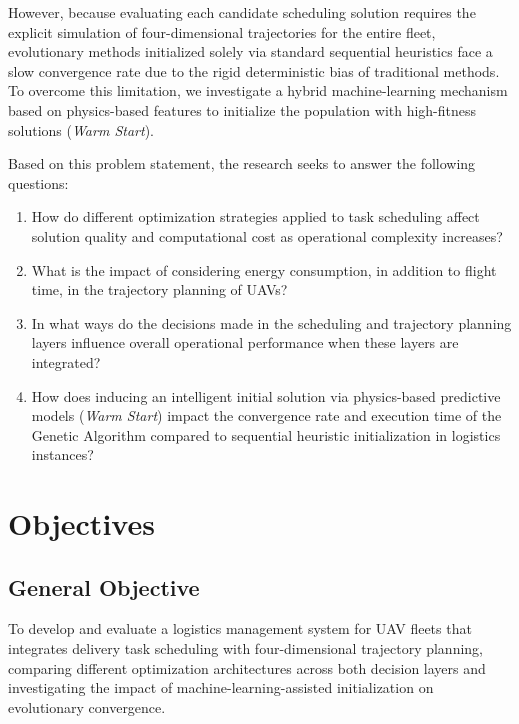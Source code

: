 However, because evaluating each candidate scheduling solution requires the explicit simulation of four-dimensional trajectories for the entire fleet, evolutionary methods initialized solely via standard sequential heuristics face a slow convergence rate due to the rigid deterministic bias of traditional methods. To overcome this limitation, we investigate a hybrid machine-learning mechanism based on physics-based features to initialize the population with high-fitness solutions (\textit{Warm Start}).

Based on this problem statement, the research seeks to answer the following questions:

\begin{enumerate}
\item How do different optimization strategies applied to task scheduling affect solution quality and computational cost as operational complexity increases?

\item What is the impact of considering energy consumption, in addition to flight time, in the trajectory planning of UAVs?

\item In what ways do the decisions made in the scheduling and trajectory planning layers influence overall operational performance when these layers are integrated?

\item How does inducing an intelligent initial solution via physics-based predictive models (\textit{Warm Start}) impact the convergence rate and execution time of the Genetic Algorithm compared to sequential heuristic initialization in logistics instances?
\end{enumerate}

\section{Objectives}

\subsection{General Objective}

To develop and evaluate a logistics management system for UAV fleets that integrates delivery task scheduling with four-dimensional trajectory planning, comparing different optimization architectures across both decision layers and investigating the impact of machine-learning-assisted initialization on evolutionary convergence.

